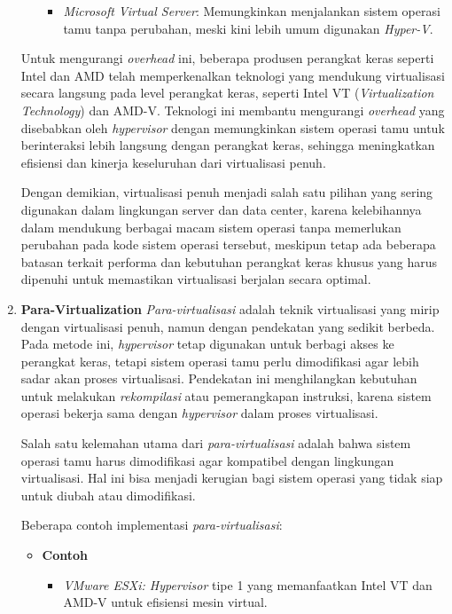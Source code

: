 \documentclass[12pt]{article}
\begin{document}
\begin{enumerate}
\begin{itemize}
\begin{itemize}
            \item \textit{Microsoft Virtual Server}: Memungkinkan menjalankan sistem operasi tamu tanpa perubahan, meski kini lebih umum digunakan \textit{Hyper-V}.
        \end{itemize}
    \end{itemize}
    Untuk mengurangi \textit{overhead} ini, beberapa produsen perangkat keras seperti Intel dan AMD telah memperkenalkan teknologi yang mendukung virtualisasi secara langsung pada level perangkat keras, seperti Intel VT (\textit{Virtualization Technology}) dan AMD-V. Teknologi ini membantu mengurangi \textit{overhead} yang disebabkan oleh \textit{hypervisor} dengan memungkinkan sistem operasi tamu untuk berinteraksi lebih langsung dengan perangkat keras, sehingga meningkatkan efisiensi dan kinerja keseluruhan dari virtualisasi penuh.
    
    \par Dengan demikian, virtualisasi penuh menjadi salah satu pilihan yang sering digunakan dalam lingkungan server dan data center, karena kelebihannya dalam mendukung berbagai macam sistem operasi tanpa memerlukan perubahan pada kode sistem operasi tersebut, meskipun tetap ada beberapa batasan terkait performa dan kebutuhan perangkat keras khusus yang harus dipenuhi untuk memastikan virtualisasi berjalan secara optimal.

    \item \textbf{Para-Virtualization}
    \newline \textit{Para-virtualisasi} adalah teknik virtualisasi yang mirip dengan virtualisasi penuh, namun dengan pendekatan yang sedikit berbeda. Pada metode ini, \textit{hypervisor} tetap digunakan untuk berbagi akses ke perangkat keras, tetapi sistem operasi tamu perlu dimodifikasi agar lebih sadar akan proses virtualisasi. Pendekatan ini menghilangkan kebutuhan untuk melakukan \textit{rekompilasi} atau pemerangkapan instruksi, karena sistem operasi bekerja sama dengan \textit{hypervisor} dalam proses virtualisasi.

    \par Salah satu kelemahan utama dari \textit{para-virtualisasi} adalah bahwa sistem operasi tamu harus dimodifikasi agar kompatibel dengan lingkungan virtualisasi. Hal ini bisa menjadi kerugian bagi sistem operasi yang tidak siap untuk diubah atau dimodifikasi. 
    
    \par Beberapa contoh implementasi \textit{para-virtualisasi}:
    \begin{itemize}
        \item \textbf{Contoh}
        \begin{itemize}
            \item \textit{VMware ESXi: Hypervisor} tipe 1 yang memanfaatkan Intel VT dan AMD-V untuk efisiensi mesin virtual.


\end{itemize}
\end{itemize}
\end{enumerate}
\end{document}
